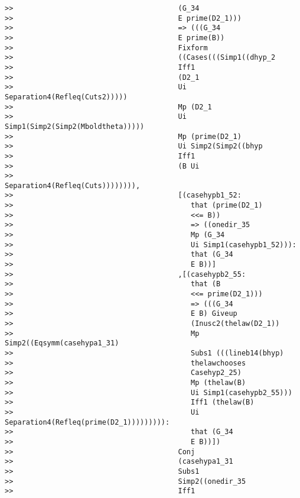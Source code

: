 \documentclass[12pt]{article}
\begin{document}
\begin{verbatim}
>>                                       (G_34
>>                                       E prime(D2_1)))
>>                                       => (((G_34
>>                                       E prime(B))
>>                                       Fixform
>>                                       ((Cases(((Simp1((dhyp_2
>>                                       Iff1
>>                                       (D2_1
>>                                       Ui Separation4(Refleq(Cuts2)))))
>>                                       Mp (D2_1
>>                                       Ui Simp1(Simp2(Simp2(Mboldtheta)))))
>>                                       Mp (prime(D2_1)
>>                                       Ui Simp2(Simp2((bhyp
>>                                       Iff1
>>                                       (B Ui
>>                                       Separation4(Refleq(Cuts)))))))),
>>                                       [(casehypb1_52:
>>                                          that (prime(D2_1)
>>                                          <<= B))
>>                                          => ((onedir_35
>>                                          Mp (G_34
>>                                          Ui Simp1(casehypb1_52))):
>>                                          that (G_34
>>                                          E B))]
>>                                       ,[(casehypb2_55:
>>                                          that (B
>>                                          <<= prime(D2_1)))
>>                                          => (((G_34
>>                                          E B) Giveup
>>                                          (Inusc2(thelaw(D2_1))
>>                                          Mp Simp2((Eqsymm(casehypa1_31)
>>                                          Subs1 (((lineb14(bhyp)
>>                                          thelawchooses
>>                                          Casehyp2_25)
>>                                          Mp (thelaw(B)
>>                                          Ui Simp1(casehypb2_55)))
>>                                          Iff1 (thelaw(B)
>>                                          Ui Separation4(Refleq(prime(D2_1))))))))):
>>                                          that (G_34
>>                                          E B))])
>>                                       Conj
>>                                       (casehypa1_31
>>                                       Subs1
>>                                       Simp2((onedir_35
>>                                       Iff1

\end{verbatim}
\end{document}
